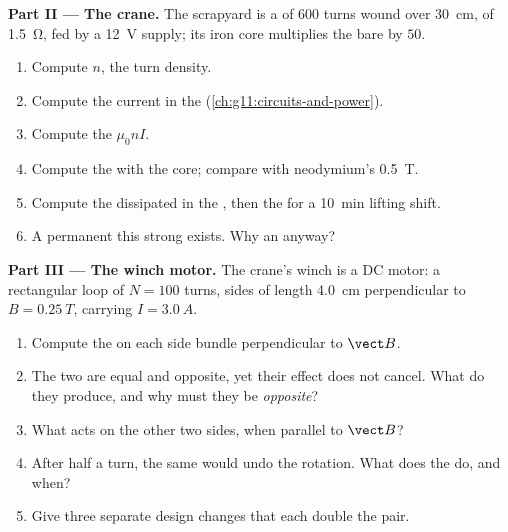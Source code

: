 \begin{problem}
\medskip
\noindent\textbf{Part II --- The crane.}
The scrapyard  is a  of $600$ turns wound over
\qty{30}{cm}, of  \qty{1.5}{\ohm}, fed by a \qty{12}{V}
supply; its iron core multiplies the bare  by $50$.
\begin{enumerate}[resume]
  \item Compute $n$, the turn density.
  \item Compute the current in the  (\cref{ch:g11:circuits-and-power}).
  \item Compute the   $\mu_0 n I$.
  \item Compute the  with the core; compare with neodymium's \qty{0.5}{T}.
  \item Compute the  dissipated in the , then the  for
        a \qty{10}{\minute} lifting shift.
  \item A permanent  this strong exists. Why an  anyway?
\end{enumerate}

\medskip
\noindent\textbf{Part III --- The winch motor.}
The crane's winch is a DC motor: a rectangular loop of $N = 100$ turns,
sides of length \qty{4.0}{cm} perpendicular to $B = \qty{0.25}{T}$,
carrying $I = \qty{3.0}{A}$.
\begin{enumerate}[resume]
  \item Compute the  on each side bundle perpendicular to $\vect B$.
  \item The two  are equal and opposite, yet their effect does not
        cancel. What do they produce, and why must they be \emph{opposite}?
  \item What  acts on the other two sides, when parallel to $\vect B$?
  \item After half a turn, the same  would undo the rotation.
        What does the  do, and when?
  \item Give three separate design changes that each double the  pair.
\end{enumerate}


\end{problem}

